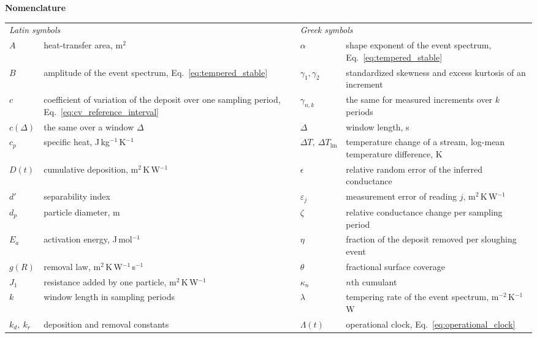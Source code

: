 \begin{table}[tb]
\noindent\textbf{Nomenclature}\par\vspace{3pt}
\footnotesize
\begin{tabular*}{\textwidth}{@{\extracolsep{\fill}}l p{} l l p{}}
\toprule
\multicolumn{2}{l}{\emph{Latin symbols}} & & \multicolumn{2}{l}{\emph{Greek symbols}}\\
$A$ & heat-transfer area, m$^2$ & & $\alpha$ & shape exponent of the event spectrum, Eq.~\eqref{eq:tempered_stable}\\
$B$ & amplitude of the event spectrum, Eq.~\eqref{eq:tempered_stable} & & $\gamma_1,\gamma_2$ & standardized skewness and excess kurtosis of an increment\\
$c$ & coefficient of variation of the deposit over one sampling period, Eq.~\eqref{eq:cv_reference_interval} & & $\gamma_{n,k}$ & the same for measured increments over $k$ periods\\
$c(\Delta)$ & the same over a window $\Delta$ & & $\Delta$ & window length, s\\
$c_p$ & specific heat, J\,kg$^{-1}$\,K$^{-1}$ & & $\Delta T,\ \Delta T_{\mathrm{lm}}$ & temperature change of a stream, log-mean temperature difference, K\\
$D(t)$ & cumulative deposition, m$^2$\,K\,W$^{-1}$ & & $\epsilon$ & relative random error of the inferred conductance\\
$d'$ & separability index & & $\varepsilon_j$ & measurement error of reading $j$, m$^2$\,K\,W$^{-1}$\\
$d_p$ & particle diameter, m & & $\zeta$ & relative conductance change per sampling period\\
$E_a$ & activation energy, J\,mol$^{-1}$ & & $\eta$ & fraction of the deposit removed per sloughing event\\
$g(R)$ & removal law, m$^2$\,K\,W$^{-1}$\,s$^{-1}$ & & $\theta$ & fractional surface coverage\\
$J_1$ & resistance added by one particle, m$^2$\,K\,W$^{-1}$ & & $\kappa_n$ & $n$th cumulant\\
$k$ & window length in sampling periods & & $\lambda$ & tempering rate of the event spectrum, m$^{-2}$\,K$^{-1}$\,W\\
$k_d,\ k_r$ & deposition and removal constants & & $\Lambda(t)$ & operational clock, Eq.~\eqref{eq:operational_clock}\\

\end{tabular*}
\end{table}
